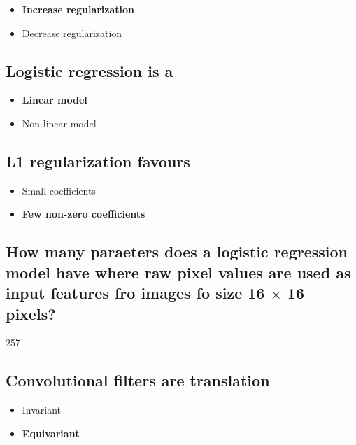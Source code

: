 \documentclass[11pt]{article}
\begin{document}
\begin{itemize}
    \item \textbf{Increase regularization}
    \item Decrease regularization
\end{itemize}

\subsection{Logistic regression is a}

\begin{itemize}
    \item \textbf{Linear model}
    \item Non-linear model
\end{itemize}

\subsection{L1 regularization favours}

\begin{itemize}
    \item Small coefficients
    \item \textbf{Few non-zero coefficients}
\end{itemize}

\subsection{How many paraeters does a logistic regression model have where raw pixel values are used as input features fro images fo size 16 $\times$ 16 pixels?}

257

\subsection{Convolutional filters are translation}

\begin{itemize}
    \item Invariant
    \item \textbf{Equivariant}
\end{itemize}
\end{document}
